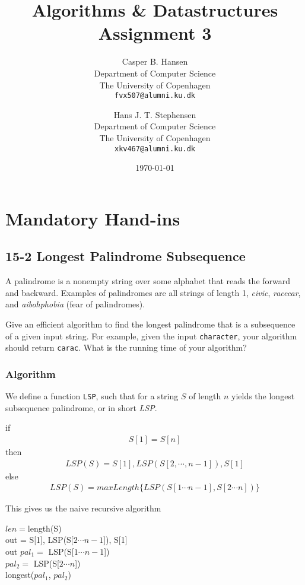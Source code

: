 \documentclass[11pt,english]{article}
\title
{
	\vspace{1in}
	Algorithms \& Datastructures\\
	\huge Assignment 3
}
\author
{
	Casper B. Hansen\\
	\small Department of Computer Science\\
	\small The University of Copenhagen\\
	\texttt{fvx507@alumni.ku.dk}
	\and
	Hans J. T. Stephensen\\
	\small Department of Computer Science\\
	\small The University of Copenhagen\\
	\texttt{xkv467@alumni.ku.dk}
}
\date{\today}
\begin{document}
\clearpage
\maketitle
\thispagestyle{empty}


\newpage
\pagestyle{fancy}

\section*{Mandatory Hand-ins}

\subsection*{15-2 Longest Palindrome Subsequence}
\large{A palindrome is a nonempty string over some alphabet that reads the
forward and backward. Examples of palindromes are all strings of length 1,
\textit{civic}, \textit{racecar}, and \textit{aibohphobia} (fear of
palindromes).

Give an efficient algorithm to find the longest palindrome that is a
subsequence of a given input string. For example, given the input
\texttt{character}, your algorithm should return \texttt{carac}. What is the
running time of your algorithm?}

\subsubsection*{Algorithm}
We define a function \texttt{LSP}, such that for a string $S$ of length $n$
yields the longest subsequence palindrome, or in short \textit{LSP}.

if
\begin{align*}
S[1] = S[n]
\end{align*}
then
\begin{align*}
LSP(S) = S[1], LSP(S[2, \cdots , n-1]), S[1]
\end{align*}
else
\begin{align*}
LSP(S) = maxLength\{ LSP(S[1 \cdots n-1], S[2 \cdots n]) \}
\end{align*}

\noindent
This gives us the naive recursive algorithm

\begin{algorithm}
	
	\BlankLine
	
	$len = $length(S) \\
	{   
	    out = S[1], LSP(S[$2 \cdots n-1$]), S[1] \\
		\Return out
	}	
	$pal_1 =$ LSP(S[$1 \cdots n-1$]) \\
	$pal_2 =$ LSP(S[$2 \cdots n$]) \\
	\Return longest($pal_1$, $pal_2$)
\end{algorithm}
\end{document}
